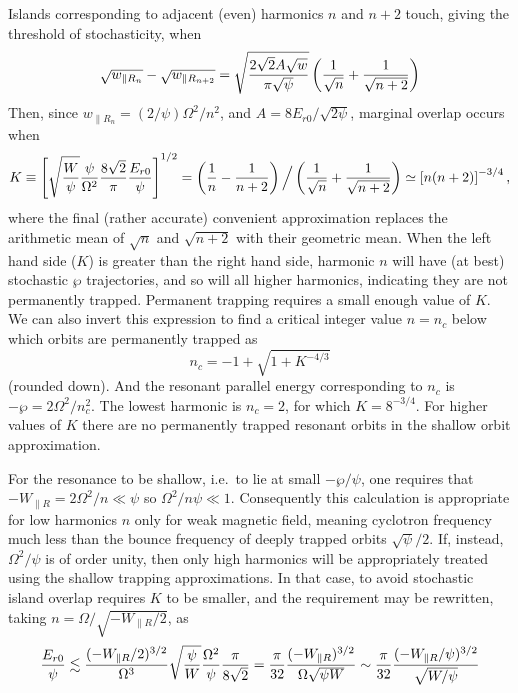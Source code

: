 Islands corresponding to adjacent (even) harmonics $n$ and $n+2$
touch, giving the threshold of stochasticity, when 
\begin{equation}
  \label{eq:touching}
  \sqrt{w_{\parallel R_n}}-\sqrt{w_{\parallel R_{n+2}}}=\sqrt{2\sqrt{2}A\sqrt{w}\over \pi\sqrt{\psi}}\left({1\over\sqrt{n}}+{1\over\sqrt{n+2}}\right)
\end{equation}
Then, since $w_{\parallel R_n}=(2/\psi)\Omega^2/n^2$, and
$A=8E_{r0}/\sqrt{2\psi}$, marginal overlap
occurs when
\begin{equation}
  \label{eq:Kmarginal}
  K\equiv
  \left[{\sqrt{W\over\psi}{\psi\over\Omega^2}{8\sqrt{2}\over \pi}{E_{r0}\over\psi}}\right]^{1/2}
  = \left({1\over n}-{1\over n+2}\right)\Big/
  \left({1\over\sqrt{n}}+{1\over\sqrt{n+2}}\right)
  \simeq \left[n(n+2)\right]^{-3/4},
\end{equation}
where the final (rather accurate) convenient approximation replaces the
arithmetic mean of $\sqrt{n}$ and $\sqrt{n+2}$ with their geometric
mean. When the left hand side ($K$)
is greater than the right hand side, harmonic $n$ will have (at best)
stochastic $\wp$ trajectories, and so will all higher
harmonics, indicating they are not permanently trapped.
Permanent trapping requires a small enough value of
$K$. We can also invert this expression to find a
critical integer value $n=n_c$ below which orbits are permanently
trapped as
\begin{equation}
  \label{eq:ncrit}
  n_c=-1+\sqrt{1+K^{-4/3}}
\end{equation}
(rounded down). And the resonant parallel energy corresponding to
$n_c$ is $-\wp =2\Omega^2/n_c^2$. The lowest harmonic is
$n_c=2$, for which $K=8^{-3/4}$. For higher values of $K$ there are no
permanently trapped resonant orbits in the shallow orbit
approximation. 

For the resonance to be shallow, i.e.\ to lie at small
$-\wp/\psi$, one requires that
$-W_{\parallel R}=2\Omega^2/n\ll \psi$ so $\Omega^2/n\psi\ll
1$.
Consequently this calculation is appropriate for low harmonics $n$
only for weak magnetic field, meaning cyclotron frequency much less
than the bounce frequency of deeply trapped orbits $\sqrt{\psi}/2$.
If, instead, $\Omega^2/\psi$ is of order unity, then only high
harmonics will be appropriately treated using the shallow trapping
approximations. In that case, to avoid stochastic island overlap
requires $K$ to be smaller, and the requirement may be rewritten,
taking $n=\Omega/\sqrt{-W_{\parallel R}/2}$, as 
\begin{equation}
  \label{eq:highharm}
  {E_{r0}\over\psi}  \lesssim
  {(-W_{\parallel R}/2)^{3/2}\over\Omega^3}\sqrt{\psi\over W} 
  {\Omega^2\over\psi} {\pi\over 8\sqrt2} =
  {\pi\over 32}
  {(-W_{\parallel R})^{3/2}\over\Omega\sqrt{\psi W}} 
  \sim {\pi\over 32} {(-W_{\parallel R}/\psi)^{3/2}\over \sqrt{W/\psi}}
\end{equation}

